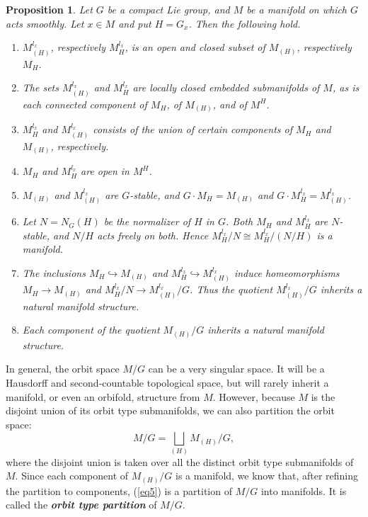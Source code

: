 \documentclass[11pt]{article}
\newtheorem{Proposition}[Theorem]{Proposition}
\numberwithin{equation}{section}
\newcommand{\deff}[1]{\textbf{\emph{#1}}}
\newcommand{\litlet}{\renewcommand{\labelenumi}{(\alph{enumi})}}
\begin{document}
\begin{Proposition} \label{prop2}
Let $G$ be a compact Lie group, and $M$ be a manifold on which $G$ acts smoothly.  Let $x \in M$ and put $H = G_x$.  Then the following hold.
\begin{enumerate} \itemsep=0pt\litlet

  \item $M_{(H)}^{l_x}$, respectively $M_{H}^{l_x}$, is an open and closed subset of $M_{(H)}$, respectively $M_H$.

  \item The sets $M_{(H)}^{l_x}$ and $M_H^{l_x}$ are locally closed embedded submanifolds of $M$, as is each connected component of $M_H$, of $M_{(H)}$, and of $M^H$.

  \item $M_H^{l_x}$ and $M_{(H)}^{l_x}$ consists of the union of certain components of $M_H$ and $M_{(H)}$, respectively.

  \item $M_H$ and $M_H^{l_x}$ are open in $M^H$.

  \item $M_{(H)}$ and $M_{(H)}^{l_x}$ are $G$-stable, and $G \cdot M_H = M_{(H)}$ and $G \cdot M_H^{l_x} = M_{(H)}^{l_x}$.

  \item Let $N=N_G(H)$ be the normalizer of $H$ in $G$. Both $M_H$ and $M_H^{l_x}$ are $N$-stable, and $N/H$ acts freely on both.  Hence $M_H^{l_x} / N \cong M_H^{l_x} / \left( N/H \right)$ is a manifold.

  \item The inclusions $M_H \hookrightarrow M_{(H)}$ and $M_H^{l_x} \hookrightarrow M_{(H)}^{l_x}$ induce homeomorphisms $M_H \to M_{(H)}$ and $M_H^{l_x} / N \to M_{(H)}^{l_x} / G$.  Thus the quotient $M_{(H)}^{l_x} / G$ inherits a natural manifold structure.

  \item Each component of the quotient $M_{(H)} / G$ inherits a natural manifold structure.
\end{enumerate}
\end{Proposition}


In general, the orbit space $M/G$ can be a very singular space.  It will be a Hausdorf\/f and second-countable topological space, but will rarely inherit a manifold, or even an orbifold, structure from $M$.
However, because $M$ is the disjoint union of its orbit type submanifolds, we can also partition the orbit space:
\begin{equation}
 \label{eq5}
   M/G = \bigsqcup_{(H)} M_{(H)}/G,
\end{equation}
where the disjoint union is taken over all the distinct orbit type submanifolds of $M$.
Since each component of $M_{(H)}/G$ is a manifold, we know that, after ref\/ining the partition to components, (\ref{eq5}) is a partition of $M/G$ into manifolds.  It is called the \deff{orbit type partition} of $M/G$.
\end{document}
